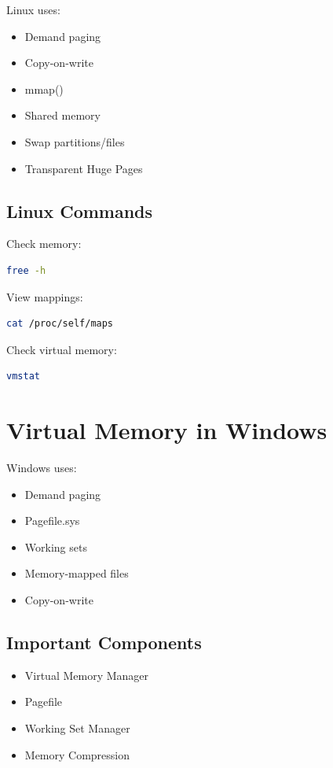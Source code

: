 Linux uses:

\begin{itemize}
\item Demand paging
\item Copy-on-write
\item mmap()
\item Shared memory
\item Swap partitions/files
\item Transparent Huge Pages
\end{itemize}

\subsection{Linux Commands}

Check memory:

\begin{lstlisting}[style=interviewcode,language=bash]
free -h
\end{lstlisting}

View mappings:

\begin{lstlisting}[style=interviewcode,language=bash]
cat /proc/self/maps
\end{lstlisting}

Check virtual memory:

\begin{lstlisting}[style=interviewcode,language=bash]
vmstat
\end{lstlisting}

\section{Virtual Memory in Windows}

Windows uses:

\begin{itemize}
\item Demand paging
\item Pagefile.sys
\item Working sets
\item Memory-mapped files
\item Copy-on-write
\end{itemize}

\subsection{Important Components}

\begin{itemize}
\item Virtual Memory Manager
\item Pagefile
\item Working Set Manager
\item Memory Compression
\end{itemize}

